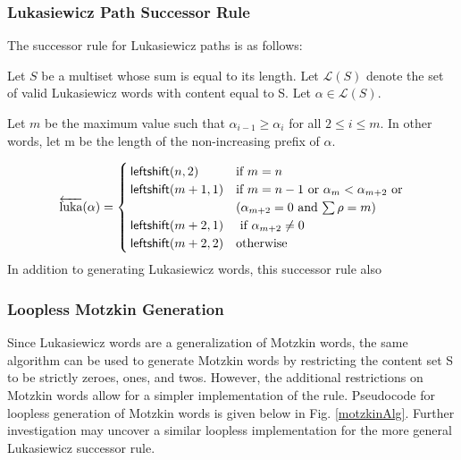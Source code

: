 


\subsubsection{Lukasiewicz Path Successor Rule}
The successor rule for Lukasiewicz paths is as follows:

Let $S$ be a multiset whose sum is equal to its length.  Let $\mathcal{L}(S)$ denote the set of valid Lukasiewicz words with content equal to S. Let $\alpha \in \mathcal{L}(S)$.  

Let $m$ be the maximum value such that $\alpha_{i-1} \ge \alpha_{i}$ for all $2 \le i \le m$. In other words, let m be the length of the non-increasing prefix of $\alpha$.

\negro


\begin{equation*}
    \overleftarrow{\text{luka}}(\alpha) = \begin{cases}
	\leftshift{n}{2} & $if $ m=n \\
	\leftshift{m+1}{1} & $if $ m=n-1 $ or $ \alpha_{m} < \alpha_{m+2}  $ or$ \\
    & (\alpha_{m+2} = 0 $ and $ \sum \rho = m) \\
	\leftshift{m+2}{1} & $ if $ \alpha_{m+2} \neq 0 \\
	\leftshift{m+2}{2} & $otherwise$  \\
\end{cases}
\end{equation*}
In addition to generating Lukasiewicz words, this successor rule also 


\subsubsection{Loopless Motzkin Generation}
Since Lukasiewicz words are a generalization of Motzkin words, the same algorithm can be used to generate Motzkin words by restricting the content set S to be strictly zeroes, ones, and twos.  However, the additional restrictions on Motzkin words allow for a simpler implementation of the rule.   Pseudocode for loopless generation of Motzkin words is given below in Fig. \ref{motzkinAlg}. Further investigation may uncover a similar loopless implementation for the more general Lukasiewicz successor rule.



